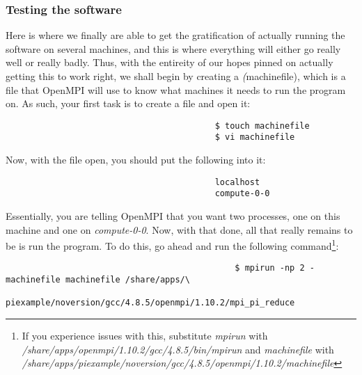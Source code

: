 \documentclass[]{article}
\begin{document}
                                          \subsubsection{Testing the software}
                                          Here is where we finally are able to get the gratification of actually running the software on several machines, and this is where 
                                          everything will either go really well or really badly. Thus, with the entireity of our hopes pinned on actually getting this to work 
                                          right, we shall begin by creating a \textit(machinefile), which is a file that OpenMPI will use to know what machines it needs to run 
                                          the program on. As such, your first task is to create a file and open it:
                                          \begin{lstlisting}
                                          $ touch machinefile
                                          $ vi machinefile
                                          \end{lstlisting}
                                          Now, with the file open, you should put the following into it:
                                          \begin{lstlisting}
                                          localhost
                                          compute-0-0
                                          \end{lstlisting}
                                          Essentially, you are telling OpenMPI that you want two processes, one on this machine and one on \textit{compute-0-0}. Now, with that 
                                          done, all that really remains to be is run the program. To do this, go ahead and run the following command\footnote{If you experience
                                              issues with this, substitute \textit{mpirun} with \textit{/share/apps/openmpi/1.10.2/gcc/4.8.5/bin/mpirun} and \textit{machinefile} 
                                              with \textit{/share/apps/piexample/noversion/gcc/4.8.5/openmpi/1.10.2/machinefile}}:
                                              \begin{lstlisting}
                                              $ mpirun -np 2 -machinefile machinefile /share/apps/\
                                                  piexample/noversion/gcc/4.8.5/openmpi/1.10.2/mpi_pi_reduce
                                                  \end{lstlisting}
\end{document}
